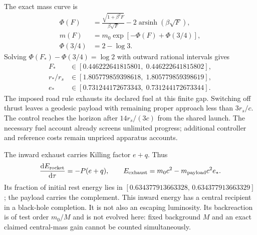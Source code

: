 \documentclass[10pt,twocolumn,letterpaper]{article}
\newcommand{\dd}{\mathrm{d}}
\begin{document}
The exact mass curve is
\begin{equation}
 \begin{split}
 \Phi(F)&=\frac{\sqrt{1+\beta^2F}}{\beta\sqrt F}
                -2\operatorname{arsinh}(\beta\sqrt F),\\
 m(F)&=m_0\exp[-\Phi(F)+\Phi(3/4)],\\
 \Phi(3/4)&=2-\log3 .
 \end{split}
\end{equation}
Solving $\Phi(F_*)-\Phi(3/4)=\log2$ with outward rational intervals gives
\begin{equation}
 \begin{split}
 F_*&\in[0.446222641815801,\;0.446222641815802],\\
 r_*/r_s&\in[1.805779859398618,\;1.805779859398619],\\
 e_*&\in[0.731244172673343,\;0.731244172673344].
 \end{split}
\end{equation}
The imposed road rule exhausts its declared fuel at this finite gap.
Switching off thrust leaves a geodesic payload with remaining proper
approach less than $3r_s/c$. The control reaches the horizon after
$14r_s/(3c)$ from the shared launch. The necessary fuel account already
screens unlimited progress; additional controller and reference costs
remain unpriced apparatus accounts.

The inward exhaust carries Killing factor $e+q$. Thus
\begin{equation}
 \frac{\dd E_{\rm rocket}}{\dd\tau}=-P(e+q),\qquad
 E_{\rm exhaust}=m_0c^2-m_{\rm payload}c^2e_* .
\end{equation}
Its fraction of initial rest energy lies in
$[0.634377913663328,\,0.634377913663329]$; the payload carries the
complement. This inward energy has a central recipient in a black-hole
completion. It is not also an escaping luminosity. Its backreaction is
of test order $m_0/M$ and is not evolved here: fixed background $M$ and
an exact claimed central-mass gain cannot be counted simultaneously.
\end{document}
